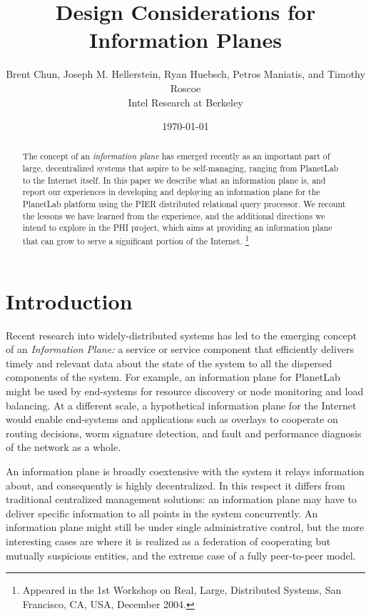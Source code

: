 \documentclass[10pt,twocolumn]{MyTightStyle}
\def\IP{information plane\xspace}
\def\PHI{PHI\xspace}
\begin{document}

\title{Design Considerations for Information Planes}
\author{Brent Chun,
  Joseph M. Hellerstein,
  Ryan Huebsch,
  Petros Maniatis, and
  Timothy Roscoe
\vspace{10pt}\\
Intel Research at Berkeley}
\date{\today}
\maketitle
\thispagestyle{plain}

\begin{abstract}
The concept of an \textit{information plane} has emerged recently as
an important part of large, decentralized systems that aspire to be
self-managing, ranging from PlanetLab to the Internet itself.  In this
paper we describe what an information plane is, and report our
experiences in developing and deploying an \IP for the PlanetLab
platform using the PIER distributed relational query processor.  We
recount the lessons we have learned from the experience, and the
additional directions we intend to explore in the \PHI project, which
aims at providing an information plane that can grow to serve a
significant portion of the Internet.
\footnote{Appeared in
    the 1st Workshop on Real, Large, Distributed Systems, San Francisco, CA,
    USA, December 2004.}
\end{abstract}

\section{Introduction}
\label{sec:intro}

Recent research into widely-distributed systems has led to
the emerging concept of an \emph{Information Plane:} a service
or service component that efficiently delivers timely and relevant
data about the state of the system to all the dispersed components of
the system.   For example, an \IP for PlanetLab might be used by
end-systems for resource discovery or node monitoring and load
balancing.  At a different scale, a hypothetical \IP for the Internet
would enable end-systems and applications such as overlays to
cooperate on routing decisions, worm signature detection, and fault
and performance diagnosis of the network as a whole.  

An information plane is broadly coextensive with the system it relays
information about, and consequently is highly decentralized.  In this
respect it differs from traditional centralized management solutions:
an information plane may have to deliver specific information to all
points in the system concurrently.  An \IP might still be under single
administrative control, but the more interesting cases are where it is
realized as a federation of cooperating but mutually suspicious
entities, and the extreme case of a fully peer-to-peer model. 
\end{document}
